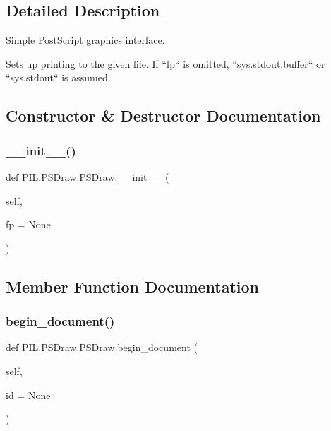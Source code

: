 \subsection{Detailed Description}
Simple Post\+Script graphics interface. 

\begin{DoxyVerb}Sets up printing to the given file. If ``fp`` is omitted,
``sys.stdout.buffer`` or ``sys.stdout`` is assumed.
\end{DoxyVerb}
 

\subsection{Constructor \& Destructor Documentation}
\mbox{\label{classPIL_1_1PSDraw_1_1PSDraw_a766011e5bc915155dc66544291a7c265}} 
\subsubsection{\texorpdfstring{\+\_\+\+\_\+init\+\_\+\+\_\+()}{\_\_init\_\_()}}
{\footnotesize\ttfamily def P\+I\+L.\+P\+S\+Draw.\+P\+S\+Draw.\+\_\+\+\_\+init\+\_\+\+\_\+ (\begin{DoxyParamCaption}\item[{}]{self,  }\item[{}]{fp = {\ttfamily None} }\end{DoxyParamCaption})}



\subsection{Member Function Documentation}
\mbox{\label{classPIL_1_1PSDraw_1_1PSDraw_ada4d3761b9fbda20e9b54e7eb8877e4b}} 
\subsubsection{\texorpdfstring{begin\+\_\+document()}{begin\_document()}}
{\footnotesize\ttfamily def P\+I\+L.\+P\+S\+Draw.\+P\+S\+Draw.\+begin\+\_\+document (\begin{DoxyParamCaption}\item[{}]{self,  }\item[{}]{id = {\ttfamily None} }\end{DoxyParamCaption})}

